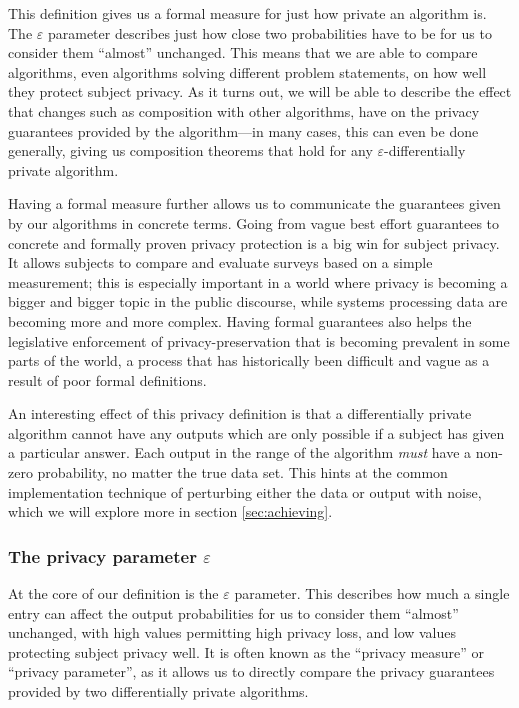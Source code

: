 \documentclass[a4paper,12pt]{article}
\renewcommand{\epsilon}{\varepsilon}
\begin{document}
This definition gives us a formal measure for just how private an algorithm is. The $\epsilon$ parameter describes just how close two probabilities have to be for us to consider them ``almost'' unchanged. This means that we are able to compare algorithms, even algorithms solving different problem statements, on how well they protect subject privacy. As it turns out, we will be able to describe the effect that changes such as composition with other algorithms, have on the privacy guarantees provided by the algorithm---in many cases, this can even be done generally, giving us composition theorems that hold for any $\epsilon$-differentially private algorithm.

Having a formal measure further allows us to communicate the guarantees given by our algorithms in concrete terms. Going from vague best effort guarantees to concrete and formally proven privacy protection is a big win for subject privacy. It allows subjects to compare and evaluate surveys based on a simple measurement; this is especially important in a world where privacy is becoming a bigger and bigger topic in the public discourse, while systems processing data are becoming more and more complex. Having formal guarantees also helps the legislative enforcement of privacy-preservation that is becoming prevalent in some parts of the world, a process that has historically been difficult and vague as a result of poor formal definitions.

An interesting effect of this privacy definition is that a differentially private algorithm cannot have any outputs which are only possible if a subject has given a particular answer. Each output in the range of the algorithm \emph{must} have a non-zero probability, no matter the true data set. This hints at the common implementation technique of perturbing either the data or output with noise, which we will explore more in section \ref{sec:achieving}.

\subsubsection{The privacy parameter $\epsilon$ \label{sec:epsilon}}

At the core of our definition is the $\epsilon$ parameter. This describes how much a single entry can affect the output probabilities for us to consider them ``almost'' unchanged, with high values permitting high privacy loss, and low values protecting subject privacy well. It is often known as the ``privacy measure'' or ``privacy parameter'', as it allows us to directly compare the privacy guarantees provided by two differentially private algorithms.
\end{document}
